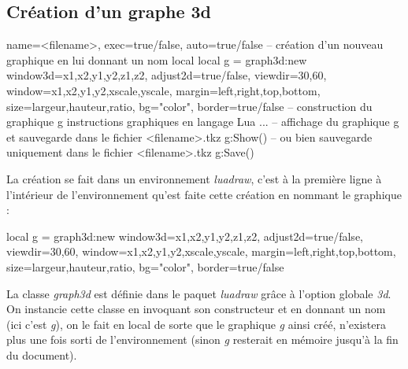 \subsection{Création d'un graphe 3d}

\begin{TeXcode}
\begin{luadraw}{ name=<filename>, exec=true/false, auto=true/false }
-- création d'un nouveau graphique en lui donnant un nom local
local g = graph3d:new{ window3d={x1,x2,y1,y2,z1,z2}, adjust2d=true/false, viewdir={30,60}, window={x1,x2,y1,y2,xscale,yscale}, margin={left,right,top,bottom}, size={largeur,hauteur,ratio}, bg="color", border=true/false }
-- construction du graphique g
    instructions graphiques en langage Lua ...
-- affichage du graphique g et sauvegarde dans le fichier <filename>.tkz
g:Show()
-- ou bien sauvegarde uniquement dans le fichier <filename>.tkz
g:Save()
\end{luadraw}
\end{TeXcode}

La création se fait dans un environnement \emph{luadraw}, c'est à la première ligne à l'intérieur de l'environnement qu'est faite cette création en nommant le graphique :

\begin{Luacode}
local g = graph3d:new{ window3d={x1,x2,y1,y2,z1,z2}, adjust2d=true/false, viewdir={30,60}, window={x1,x2,y1,y2,xscale,yscale}, margin={left,right,top,bottom}, size={largeur,hauteur,ratio}, bg="color", border=true/false }
\end{Luacode}

La classe \emph{graph3d} est définie dans le paquet \emph{luadraw} grâce à l'option globale \emph{3d}. On instancie cette classe en invoquant son constructeur et en donnant un nom (ici c'est \emph{g}), on le fait en local de sorte que le graphique \emph{g} ainsi créé, n'existera plus une fois sorti de l'environnement (sinon \emph{g} resterait en mémoire jusqu'à la fin du document).


